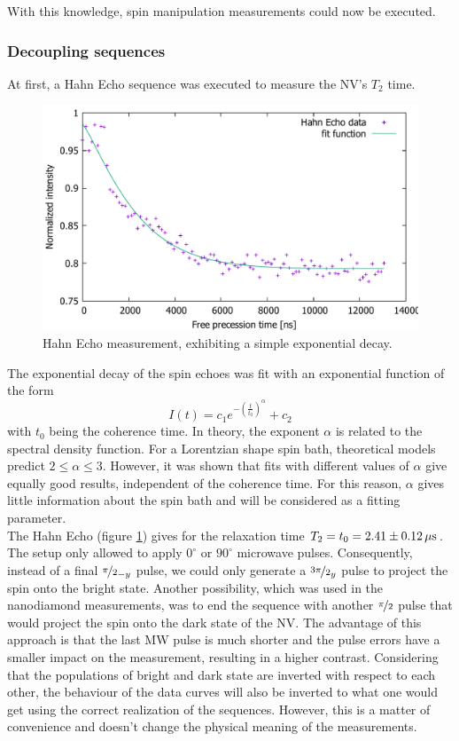 \documentclass[12pt,a4paper]{article}
\begin{document}
With this knowledge, spin manipulation measurements could now be executed. 
\subsubsection{Decoupling sequences}
At first, a Hahn Echo sequence was executed to measure the NV's $T_2$ time.
\begin{figure}[H]
\includegraphics[scale=0.6]{Hahnn110.pdf} 
\caption{Hahn Echo measurement, exhibiting a simple exponential decay.}
\label{H1}
\end{figure}
The exponential decay of the spin echoes was fit with an exponential function of the form
\begin{equation}\label{exp}
I(t)=c_1e^{-\left(\frac{t}{t_0}\right)^\alpha}+c_2
\end{equation}
with $t_0$ being the coherence time. In theory, the exponent $\alpha$ is related to the spectral density function. For a Lorentzian shape spin bath, theoretical models predict $2\leq\alpha\leq3$\cite{ess}. However, it was shown that fits with different values of $\alpha$ give equally good results, independent of the coherence time\cite{sdd}. For this reason, $\alpha$ gives little information about the spin bath and will be considered as a fitting parameter. \\
The Hahn Echo (figure \ref{H1}) gives for the relaxation time $T_2=t_0=\unit[2.41\pm 0.12]{\mu s}$. 
\\
The setup only allowed to apply $0^\circ$ or $90^\circ$ microwave pulses. Consequently, instead of a final $\nicefrac{\pi}{2}_{-y}$ pulse, we could only generate a $\nicefrac{3\pi}{2}_y$ pulse to project the spin onto the bright state. Another possibility, which was used in the nanodiamond measurements, was to end the sequence with another $\nicefrac{\pi}{2}$ pulse that would project the spin onto the dark state of the NV. The advantage of this approach is that the last MW pulse is much shorter and the pulse errors have a smaller impact on the measurement, resulting in a higher contrast. Considering that the populations of bright and dark state are inverted with respect to each other, the behaviour of the data curves will also be inverted to what one would get using the correct realization of the sequences. However, this is a matter of convenience and doesn't change the physical meaning of the measurements.
\end{document}
